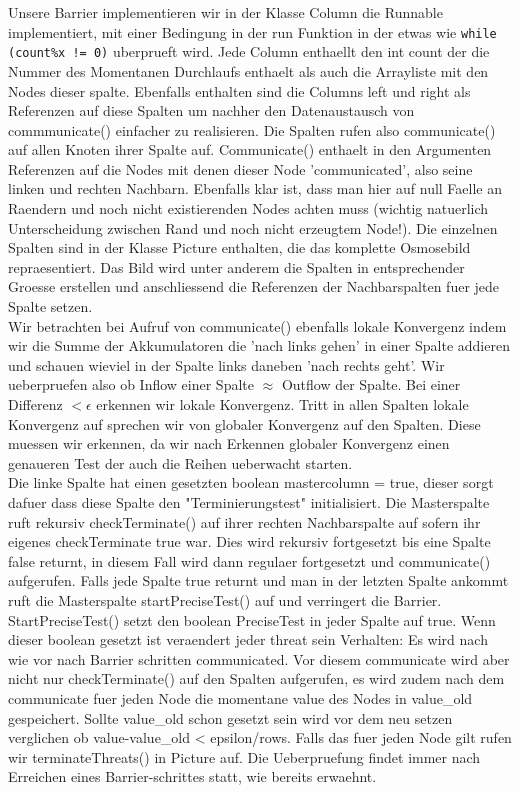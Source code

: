 \documentclass[12pt]{article}
\begin{document}
Unsere Barrier implementieren wir in der Klasse Column die Runnable implementiert, mit einer Bedingung in der run Funktion in der etwas wie \verb+while (count%x != 0)+ uberprueft wird. Jede Column enthaellt den int count der die Nummer des Momentanen Durchlaufs enthaelt als auch die Arrayliste mit den Nodes dieser spalte. Ebenfalls enthalten sind die Columns left und right als Referenzen auf diese Spalten um nachher den Datenaustausch von commmunicate() einfacher zu realisieren. Die Spalten rufen also communicate() auf allen Knoten ihrer Spalte auf. Communicate() enthaelt in den Argumenten Referenzen auf die Nodes mit denen dieser Node 'communicated', also seine linken und rechten Nachbarn. Ebenfalls klar ist, dass man hier auf null Faelle an Raendern und noch nicht existierenden Nodes achten muss (wichtig natuerlich Unterscheidung zwischen Rand und noch nicht erzeugtem Node!). Die einzelnen Spalten sind in der Klasse Picture enthalten, die das komplette Osmosebild repraesentiert. Das Bild wird unter anderem die Spalten in entsprechender Groesse erstellen und anschliessend die Referenzen der Nachbarspalten fuer jede Spalte setzen.\\
Wir betrachten bei Aufruf von communicate() ebenfalls lokale Konvergenz indem wir die Summe der Akkumulatoren die 'nach links gehen' in einer Spalte addieren und schauen wieviel in der Spalte links daneben 'nach rechts geht'. Wir ueberpruefen also ob Inflow einer Spalte $\approx$ Outflow der Spalte. Bei einer Differenz $< \epsilon$ erkennen wir lokale Konvergenz. Tritt in allen Spalten lokale Konvergenz auf sprechen wir von globaler Konvergenz auf den Spalten. Diese muessen wir erkennen, da wir nach Erkennen globaler Konvergenz einen genaueren Test der auch die Reihen ueberwacht starten. \\
Die linke Spalte hat einen gesetzten boolean mastercolumn = true, dieser sorgt dafuer dass diese Spalte den "Terminierungstest" initialisiert. Die Masterspalte ruft rekursiv checkTerminate() auf ihrer rechten Nachbarspalte auf sofern ihr eigenes checkTerminate true war. Dies wird rekursiv fortgesetzt bis eine Spalte false returnt, in diesem Fall wird dann regulaer fortgesetzt und communicate() aufgerufen. Falls jede Spalte true returnt und man in der letzten Spalte ankommt ruft die Masterspalte startPreciseTest() auf und verringert die Barrier. StartPreciseTest() setzt den boolean PreciseTest in jeder Spalte auf true. Wenn dieser boolean gesetzt ist veraendert jeder threat sein Verhalten: Es wird nach wie vor nach Barrier schritten communicated. Vor diesem communicate wird aber nicht nur checkTerminate() auf den Spalten aufgerufen, es wird zudem nach dem communicate fuer jeden Node die momentane value des Nodes in value\_old gespeichert. Sollte value\_old schon gesetzt sein wird vor dem neu setzen verglichen ob value-value\_old < epsilon/rows. Falls das fuer jeden Node gilt rufen wir terminateThreats() in Picture auf. Die Ueberpruefung findet immer nach Erreichen eines Barrier-schrittes statt, wie bereits erwaehnt.\\
\end{document}
